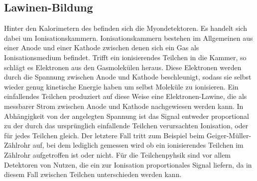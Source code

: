 \subsection{Lawinen-Bildung}
Hinter den Kalorimetern des \atlas befinden sich die Myondetektoren. Es handelt sich dabei um Ionisationskammern. Ionisationskammern bestehen im Allgemeinen aus einer Anode und einer Kathode zwischen denen sich ein Gas als Ionisationsmedium befindet. Trifft ein ionisierendes Teilchen in die Kammer, so schlägt es Elektronen aus den Gasmolekülen heraus. Diese Elektronen werden durch die Spannung zwischen Anode und Kathode beschleunigt, sodass sie selbst wieder genug kinetische Energie haben um selbst Moleküle zu ionisieren. Ein einfallendes Teilchen produziert auf diese Weise eine Elektronen-Lawine, die als messbarer Strom zwischen Anode und Kathode nachgewiesen werden kann. In Abhängigkeit von der angelegten Spannung ist das Signal entweder proportional zu der durch das ursprünglich einfallende Teilchen verursachten Ionisation, oder für jedes Teilchen gleich. Der letztere Fall tritt zum Beispiel beim Geiger-Müller-Zählrohr auf, bei dem lediglich gemessen wird ob ein ionisierendes Teilchen im Zählrohr aufgetroffen ist oder nicht. Für die Teilchenpyhsik sind vor allem Detektoren von Nutzen, die ein zur Ionisation proportionales Signal liefern, da in diesem Fall zwischen Teilchen unterschieden werden kann.
